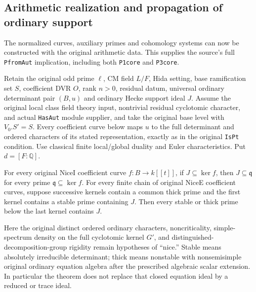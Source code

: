 \subsection{Arithmetic realization and propagation of ordinary support}
\label{subsec:selmer-arithmetic-propagation}

The normalized curves, auxiliary primes and cohomology systems can now
be constructed with the original arithmetic data.  This supplies the
source's full \texttt{PfromAut} implication, including both
\texttt{P1core} and \texttt{P3core}\cite{SelmerArPropSource}.

\begin{theorem}\label{thm:selmer-arithmetic-propagation}
Retain the original odd prime $\ell$, CM field $L/F$, Hida setting,
base ramification set $S$, coefficient DVR $O$, rank $n>0$, residual
datum, universal ordinary determinant pair $(B,u)$ and ordinary Hecke
support ideal $J$.  Assume the original local class field theory input,
nontrivial residual cyclotomic character, and actual \texttt{HasAut}
module supplier, and take the original base level with $V_0.S'=S$.
Every coefficient curve below maps $u$ to the full determinant and
ordered characters of its stated representation, exactly as in
the original \texttt{IsPt} condition.
Use classical finite local/global duality and Euler
characteristics.  Put $d=[F:\mathbb Q]$.

For every original NiceI coefficient curve
$f:B\to k[[t]]$, if $J\subseteq\ker f$, then
$J\subseteq\mathfrak q$ for every prime $\mathfrak q\subseteq\ker f$.
For every finite chain of original NiceE coefficient curves, suppose
successive kernels contain a common thick prime and the first kernel
contains a stable prime containing $J$.  Then every stable or thick
prime below the last kernel contains $J$.

Here the original distinct ordered ordinary characters, noncriticality,
simple-spectrum density on the full cyclotomic kernel $G'$, and
distinguished-decomposition-group rigidity remain hypotheses of
``nice.''  Stable means absolutely irreducible determinant; thick means
nonstable with nonsemisimple original ordinary equation algebra after
the prescribed algebraic scalar extension.  In particular the theorem
does not replace that closed equation ideal by a reduced or trace ideal.
\end{theorem}

